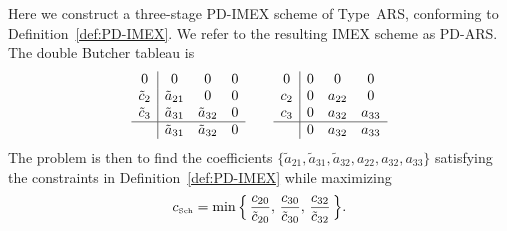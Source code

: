 Here we construct a three-stage PD-IMEX scheme of Type~ARS, conforming to Definition~\ref{def:PD-IMEX}.  
We refer to the resulting IMEX scheme as PD-ARS.  
The double Butcher tableau is
\begin{equation}
  \begin{array}{c | c c c}
  	         0           & 0                 & 0                   & 0  \\
  	\tilde{c}_{2} & \tilde{a}_{21} & 0                   & 0  \\
  	\tilde{c}_{3} & \tilde{a}_{31} & \tilde{a}_{32} & 0  \\ \hline
  	                   & \tilde{a}_{31} & \tilde{a}_{32} & 0
  \end{array}
  \qquad
  \begin{array}{c | c c c}
  	     0  & 0  & 0         & 0          \\
  	c_{2} & 0 & a_{22} & 0          \\
  	c_{3} & 0 & a_{32} & a_{33}  \\ \hline
  	         & 0 & a_{32} & a_{33}
  \end{array}
\end{equation}
The problem is then to find the coefficients $\{ \tilde{a}_{21}, \tilde{a}_{31}, \tilde{a}_{32}, a_{22}, a_{32}, a_{33} \}$ satisfying the constraints in Definition~\ref{def:PD-IMEX} while maximizing
\begin{equation}
  c_{\mbox{\tiny Sch}} = \min \Big\{\, \dfrac{c_{20}}{\tilde{c}_{20}},\, \dfrac{c_{30}}{\tilde{c}_{30}},\, \dfrac{c_{32}}{\tilde{c}_{32}} \,\Big\}.  
\end{equation}

